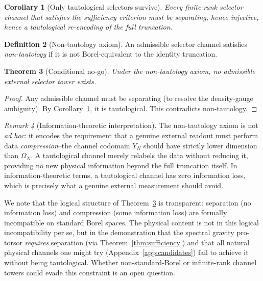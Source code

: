 \documentclass[12pt,a4paper]{article}
\theoremstyle{plain}
\newtheorem{theorem}{Theorem}[section]
\newtheorem{corollary}[theorem]{Corollary}
\theoremstyle{definition}
\newtheorem{definition}[theorem]{Definition}
\theoremstyle{remark}
\newtheorem{remark}[theorem]{Remark}
\begin{document}
\begin{corollary}[Only tautological selectors survive]
\label{cor:tautological}
Every finite-rank selector channel that satisfies the sufficiency
criterion must be separating, hence injective, hence a tautological
re-encoding of the full truncation.
\end{corollary}

\begin{definition}[Non-tautology axiom]
\label{def:NT}
An admissible selector channel satisfies \emph{non-tautology} if it
is not Borel-equivalent to the identity truncation.
\end{definition}

\begin{theorem}[Conditional no-go]
\label{thm:conditional-nogo}
Under the non-tautology axiom, no admissible external selector tower
exists.
\end{theorem}

\begin{proof}
Any admissible channel must be separating (to resolve the density-gauge
ambiguity).  By Corollary~\ref{cor:tautological}, it is tautological.
This contradicts non-tautology.
\end{proof}

\begin{remark}[Information-theoretic interpretation]
\label{rem:NT-motivation}
The non-tautology axiom is not \emph{ad hoc}: it encodes the
requirement that a genuine external readout must perform data
\emph{compression}--the channel codomain $Y_N$ should have strictly
lower dimension than $\Omega_N$.  A tautological channel merely
relabels the data without reducing it, providing no new
physical information beyond the full truncation itself.  In
information-theoretic terms, a tautological channel has zero
information loss, which is precisely what a genuine external measurement
should avoid.

We note that the logical structure of Theorem~\ref{thm:conditional-nogo}
is transparent: separation (no information loss) and compression
(some information loss) are formally incompatible on standard Borel
spaces.  The physical content is not in this logical incompatibility
per se, but in the demonstration that the spectral gravity pro-torsor
\emph{requires} separation (via Theorem~\ref{thm:sufficiency}) and
that all natural physical channels one might try (Appendix~\ref{app:candidates}) fail to achieve it without being tautological.
Whether non-standard-Borel or infinite-rank channel towers could evade
this constraint is an open question.
\end{remark}
\end{document}
